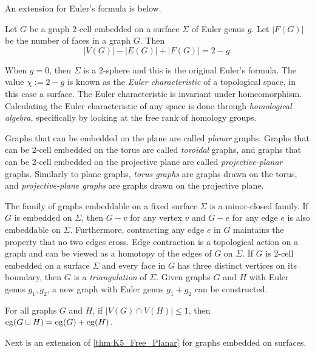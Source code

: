 An extension for Euler's formula is below. 

\begin{theorem}
	Let $G$ be a graph $2$-cell embedded on a surface $\Sigma$ of Euler genus $g$. Let \(|F(G)|\) be the number of faces in a graph \(G\). Then \[|V(G)| - |E(G)| + |F(G)| = 2 - g.\] 
\end{theorem}

When $g = 0$, then $\Sigma$ is a $2$-sphere and this is the original Euler's formula. 
The value $\chi := 2-g$ is known as the \textit{Euler characteristic} of a topological space, in this case a surface. The Euler characteristic is invariant under homeomorphism. Calculating the Euler characteristic of any space is done through \textit{homological algebra}, specifically by looking at the free rank of homology groups. 

Graphs that can be embedded on the plane are called \textit{planar} graphs. Graphs that can be 2-cell embedded on the torus are called \textit{toroidal} graphs, and graphs that can be 2-cell embedded on the projective plane are called \textit{projective-planar} graphs. Similarly to plane graphs, \textit{torus graphs} are graphs drawn on the torus, and \textit{projective-plane graphs} are graphs drawn on the projective plane. 

The family of graphs embeddable on a fixed surface $\Sigma$ is a minor-closed family. If $G$ is embedded on $\Sigma$, then $G - v$ for any vertex $v$ and $G - e$ for any edge $e$ is also embeddable on $\Sigma$. Furthermore, contracting any edge $e$ in $G$ maintains the property that no two edges cross. Edge contraction is a topological action on a graph and can be viewed as a homotopy of the edges of $G$ on $\Sigma$. 
If $G$ is 2-cell embedded on a surface $\Sigma$ and every face in $G$ has three distinct vertices on its boundary, then $G$ is a \textit{triangulation} of $\Sigma$. Given graphs $G$ and $H$ with Euler genus $g_1, g_2$, a new graph with Euler genus $g_1 + g_2$ can be constructed.
\begin{theorem}\label{thm:additivity_genus}
	For all graphs $G$ and $H$, if $|V(G) \cap V(H)| \leq 1$, then $\operatorname{eg}(G \cup H) = \operatorname{eg}(G) + \operatorname{eg}(H)$. 
\end{theorem}

Next is an extension of \cref{thm:K5_Free_Planar} for graphs embedded on surfaces. 

